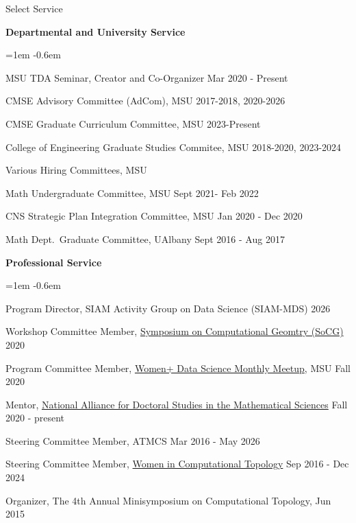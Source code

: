 \documentclass{resume} %
\begin{document}
%
\newpage
\begin{rSection}{Select Service}



\textbf{Departmental and University Service}
\begin{list}{}{\leftmargin=1em}
   \itemsep -0.6em \vspace{-0.5em} %

\item
MSU TDA Seminar, Creator and Co-Organizer  \hfill Mar 2020 - Present

\item
CMSE Advisory Committee (AdCom), MSU \hfill 2017-2018, 2020-2026
\item CMSE Graduate Curriculum Committee, MSU \hfill 2023-Present 
\item
College of Engineering Graduate Studies Commitee, MSU \hfill 2018-2020, 2023-2024
\item Various Hiring Committees, MSU  
\item Math Undergraduate Committee, MSU  \hfill  Sept 2021- Feb 2022
\item
CNS Strategic Plan Integration Committee, MSU \hfill Jan 2020 - Dec 2020
\item
Math Dept.~Graduate Committee, UAlbany \hfill Sept 2016 - Aug 2017

\end{list}

\textbf{Professional Service}
\begin{list}{}{\leftmargin=1em}
   \itemsep -0.6em \vspace{-0.5em} %
   \item Program Director, SIAM Activity Group on Data Science (SIAM-MDS) \hfill 2026
\item
Workshop Committee Member, \href{https://socg20.inf.ethz.ch/}{Symposium on Computational Geomtry (SoCG)} \hfill 2020
\item
Program Committee Member, \href{https://women-plus-datascience.github.io/}{Women+ Data Science Monthly Meetup}, MSU \hfill Fall 2020 %
\item Mentor, \href{https://mathalliance.org/mentor/liz-munch/}{National Alliance for Doctoral Studies in the Mathematical Sciences} \hfill Fall 2020 - present
\item
Steering Committee Member, ATMCS \hfill Mar 2016 - May 2026 
\item
Steering Committee Member, \href{https://awmadvance.org/research-networks/wincomptop-women-in-computational-topology/}{Women in Computational Topology} \hfill Sep 2016 - Dec 2024 
\item
{Organizer, The 4th Annual Minisymposium on Computational Topology,  } \hfill Jun 2015\\
\phantom{MMM}{CG Week at the Symposium on Computational Geometry}
\end{list}



\end{rSection}
\end{document}
